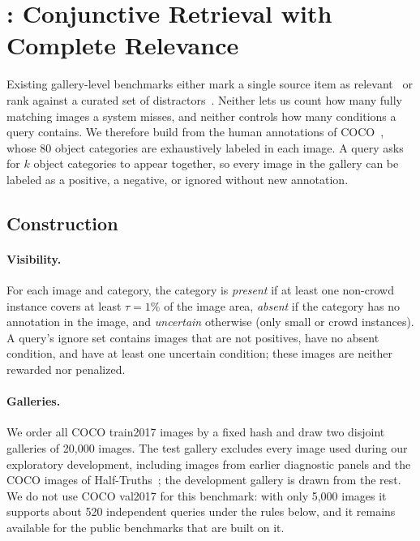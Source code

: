 \section{\bench: Conjunctive Retrieval with Complete Relevance}
\label{sec:benchmark}

Existing gallery-level benchmarks either mark a single source item as relevant~\cite{negbench2025,mcmr2026} or rank against a curated set of distractors~\cite{cola2023}.
Neither lets us count how many fully matching images a system misses, and neither controls how many conditions a query contains.
We therefore build \bench{} from the human annotations of COCO~\cite{coco2014}, whose 80 object categories are exhaustively labeled in each image.
A query asks for $k$ object categories to appear together, so every image in the gallery can be labeled as a positive, a negative, or ignored without new annotation.

\subsection{Construction}

\paragraph{Visibility.}
For each image and category, the category is \emph{present} if at least one non-crowd instance covers at least $\tau{=}1\%$ of the image area, \emph{absent} if the category has no annotation in the image, and \emph{uncertain} otherwise (only small or crowd instances).
A query's ignore set contains images that are not positives, have no absent condition, and have at least one uncertain condition; these images are neither rewarded nor penalized.

\paragraph{Galleries.}
We order all COCO train2017 images by a fixed hash and draw two disjoint galleries of 20{,}000 images.
The test gallery excludes every image used during our exploratory development, including images from earlier diagnostic panels and the COCO images of Half-Truths~\cite{halftruths2026}; the development gallery is drawn from the rest.
We do not use COCO val2017 for this benchmark: with only 5{,}000 images it supports about 520 independent queries under the rules below, and it remains available for the public benchmarks that are built on it.

